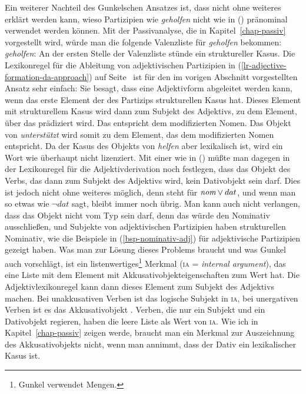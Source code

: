 Ein weiterer Nachteil des Gunkelschen Ansatzes ist, dass nicht ohne weiteres erklärt werden kann,
wieso Partizipien wie \emph{geholfen} nicht wie in () pränominal verwendet werden können.
\z
Mit der Passivanalyse, die in Kapitel~\ref{chap-passiv} vorgestellt wird, würde man die
folgende Valenzliste für \emph{geholfen} bekommen:
\ea
\emph{geholfen}: \subcat {}
\z
An der ersten Stelle der Valenzliste stünde ein struktureller Kasus. Die Lexikonregel für die
Ableitung von adjektivischen Partizipien in (\ref{lr-adjective-formation-da-approach}) 
auf Seite~\pageref{lr-adjective-formation-da-approach} ist für den im vorigen Abschnitt vorgestellten
Ansatz sehr einfach: Sie besagt, dass eine Adjektivform abgeleitet werden kann, wenn das
erste Element der \subcatl des Partizips strukturellen Kasus hat. Dieses Element mit strukturellem
Kasus wird dann zum Subjekt des Adjektivs, \dash zu dem Element, über das prädiziert wird.
Das entspricht dem modifizierten Nomen. Das Objekt von \emph{unterstützt} wird somit zu dem
Element, das dem modifizierten Nomen entspricht. Da der Kasus des Objekts von \emph{helfen}
aber lexikalisch ist, wird ein Wort wie  überhaupt nicht lizenziert. Mit einer
\subcatl wie in () müßte man dagegen in der Lexikonregel für die Adjektivderivation
noch festlegen, dass das Objekt des Verbs, das dann zum Subjekt des Adjektivs wird,
kein Dativobjekt sein darf. Dies ist jedoch nicht ohne weiteres möglich, denn 
steht für ${\normalfont\textit{nom}} \vee dat$, und wenn man so etwas wie $\neg dat$ sagt, bleibt immer noch 
übrig. Man kann auch nicht verlangen, dass das Objekt nicht vom Typ  sein darf, denn
das würde den Nominativ ausschließen, und Subjekte von adjektivischen Partizipien haben strukturellen Nominativ,
wie die Beispiele in (\ref{bsp-nominativ-adj}) für adjektivische Partizipien gezeigt haben.
Was man zur Lösung dieses Problems braucht und was Gunkel auch vorschlägt, ist ein listenwertiges\footnote{
  Gunkel verwendet Mengen.%
}
Merkmal (\textsc{ia} = \emph{internal argument}), das eine Liste mit dem Element mit Akkusativobjekteigenschaften zum Wert hat. Die
Adjektivlexikonregel kann dann dieses Element zum Subjekt des Adjektivs machen. Bei unakkusativen
Verben ist das logische Subjekt in \textsc{ia}, bei unergativen Verben ist es das Akkusativobjekt \citep[]{Gunkel2003b}.
Verben, die nur ein Subjekt und ein Dativobjekt regieren, haben die leere Liste als Wert von \textsc{ia}.
Wie ich in Kapitel~\ref{chap-passiv} zeigen werde, braucht man ein Merkmal zur Auszeichnung des
Akkusativobjekts nicht, wenn man annimmt, dass der Dativ ein lexikalischer Kasus ist.

